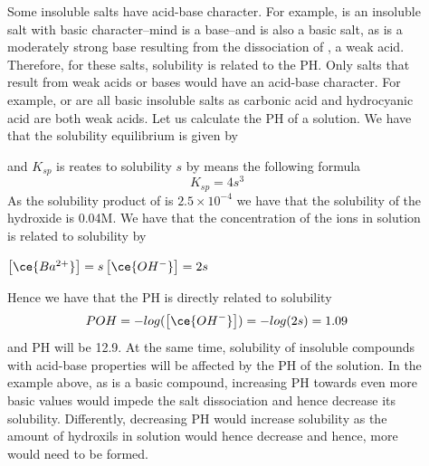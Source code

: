 \documentclass[main.tex]{subfiles}
\begin{document}
\begin{description}
\item[] Some insoluble salts have acid-base character. For example,  is an insoluble salt with basic character--mind  is a base--and  is also a basic salt, as  is a moderately strong base resulting from the dissociation of , a weak acid. Therefore, for these salts, solubility is related to the PH. Only salts that result from weak acids or bases would have an acid-base character. For example,  or  are all basic insoluble salts as carbonic acid and hydrocyanic acid are both weak acids. Let us calculate the PH of a  solution. We have that the solubility equilibrium is given by
\begin{center}	\end{center}
and $K_{sp}$ is reates to solubility $s$ by means the following formula
\[K_{sp}=4s^3			\]
As the solubility product of   is $2.5\times10^{-4}$ we have that the solubility of the hydroxide is  0.04M. We have that the concentration of the ions in solution is related to solubility by
\begin{center}$\big[ \ce{Ba^{2+}}\big]=s$\hfill$\big[ \ce{OH^{-}}\big]=2s$\end{center}
Hence we have that the PH is directly related to solubility
\[POH=-log (\big[ \ce{OH^{-}}\big])=-log(2s)=1.09			\]
and PH will be 12.9.
At the same time, solubility of insoluble compounds with acid-base properties will be affected by the PH of the solution. In the example above, as  is a basic compound,  increasing PH towards even more basic values would impede the salt dissociation and hence decrease its solubility. Differently, decreasing PH would increase solubility as the amount of hydroxils in solution would hence decrease and hence, more would need to be formed. 



\end{description}
\end{document}
